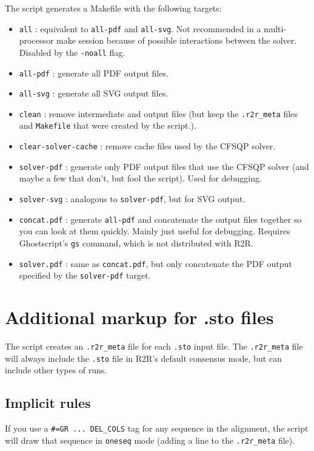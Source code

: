 \documentclass[letterpaper,12pt]{report}
\begin{document}
The script generates a Makefile with the following targets:
\begin{itemize}
\item {\tt all} : equivalent to {\tt all-pdf} and {\tt all-svg}.  Not recommended in a multi-processor make session because of possible interactions between the solver.  Disabled by the {\tt -noall} flag.
\item {\tt all-pdf} : generate all PDF output files.
\item {\tt all-svg} : generate all SVG output files.
\item {\tt clean} : remove intermediate and output files (but keep the {\tt .r2r\_meta} files and {\tt Makefile} that were created by the script.).
\item {\tt clear-solver-cache} : remove cache files used by the CFSQP solver.
\item {\tt solver-pdf} : generate only PDF output files that use the CFSQP solver (and maybe a few that don't, but fool the script).  Used for debugging.
\item {\tt solver-svg} : analogous to {\tt solver-pdf}, but for SVG output.
\item {\tt concat.pdf} : generate {\tt all-pdf} and concatenate the output files together so you can
look at them quickly.  Mainly just useful for debugging.  Requires Ghostscript's {\tt gs} command, which is not distributed
with R2R.
\item {\tt solver.pdf} : same as {\tt concat.pdf}, but only concatenate the PDF output specified by the {\tt solver-pdf} target.
\end{itemize}

\section{Additional markup for .sto files}

The script creates an {\tt .r2r\_meta} file for each {\tt .sto} input file.
The {\tt .r2r\_meta} file will always include the {\tt .sto} file in R2R's default consensus mode,
but can include other types of runs.

\subsection{Implicit rules}

If you use a {\tt \#=GR ... DEL\_COLS} tag for any sequence in the alignment,
the script will draw that sequence in {\tt oneseq} mode (adding a line to the {\tt .r2r\_meta} file).
\end{document}
